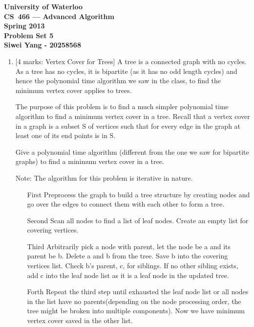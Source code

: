 \documentclass[12pt]{article}
\begin{document}
\begin{center}
\large\bf University of Waterloo\\
CS~466 --- Advanced Algorithm\\
Spring 2013\\
Problem Set 5\\
Siwei Yang - 20258568\\
\end{center}
\bigskip

\begin{enumerate}

\item{} [4 marks: Vertex Cover for Trees]
A tree is a connected graph with no cycles. As a tree has no cycles, it is bipartite (as it has no odd length cycles) and hence the polynomial time algorithm we saw in the class, to find the minimum vertex cover applies to trees.

The purpose of this problem is to find a much simpler polynomial time algorithm to find a minimum vertex cover in a tree. Recall that a vertex cover in a graph is a subset S of vertices such that for every edge in the graph at least one of its end points is in S.

Give a polynomial time algorithm (different from the one we saw for bipartite graphs) to find a minimum vertex cover in a tree.

Note: The algorithm for this problem is iterative in nature.
\begin{itemize}
\item[First]
Preprocess the graph to build a tree structure by creating nodes and go over the edges to connect them with each other to form a tree.

\item[Second]
Scan all nodes to find a list of leaf nodes. Create an empty list for covering vertices.

\item[Third]
Arbitrarily pick a node with parent, let the node be a and its parent be b. Delete a and b from the tree. Save b into the covering vertices list. Check b's parent, c, for siblings. If no other sibling exists, add c into the leaf node list as it is a leaf node in the updated tree.

\item[Forth]
Repeat the third step until exhausted the leaf node list or all nodes in the list have no parents(depending on the node processing order, the tree might be broken into multiple components). Now we have minimum vertex cover saved in the other list.


\end{itemize}
\end{enumerate}
\end{document}
